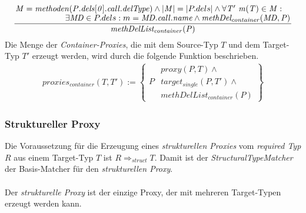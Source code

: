 \documentclass[a4paper,12pt]{article}
\begin{document}
\begin{gather*}
\frac{\splitfrac{\mathit{M} = \mathit{methoden(P.dels[0].call.delType)} \wedge |\mathit{M}| = |P.dels| \wedge \forall \mathit{T' \text{ } m(T)} \in \mathit{M}:}
{\exists \mathit{MD} \in P.dels:m = \mathit{MD.call.name} \wedge \mathit{methDel_{container}(MD,P)}
 }}
{\mathit{methDelList_{container}(P)}}
\end{gather*}
Die Menge der \emph{Container-Proxies}, die mit dem Source-Typ $T$ und dem Target-Typ $T'$ erzeugt werden, wird durch die folgende Funktion beschrieben.
\begin{gather*}
\mathit{proxies_{container}(T,T')} := 
\left\{\begin{array}{l|l}
		& \mathit{proxy(P,T)}  \wedge \mathit{ } \\
	P	& \mathit{target_{single}(P,T')} \wedge \mathit{ } \\
		& \mathit{methDelList_{container}(P)} 
		 \end{array}
\right\}
\end{gather*}

\subsubsection{Struktureller Proxy}
Die Voraussetzung für die Erzeugung eines \emph{strukturellen Proxies} vom \emph{required Typ} $R$ aus einem Target-Typ $T$ ist $R \Rightarrow_{struct} T$. Damit ist der \emph{StructuralTypeMatcher} der Basis-Matcher für den \emph{strukturellen Proxy}.\\\\
Der \emph{strukturelle Proxy} ist der einzige Proxy, der mit mehreren Target-Typen erzeugt werden kann. 
\end{document}
